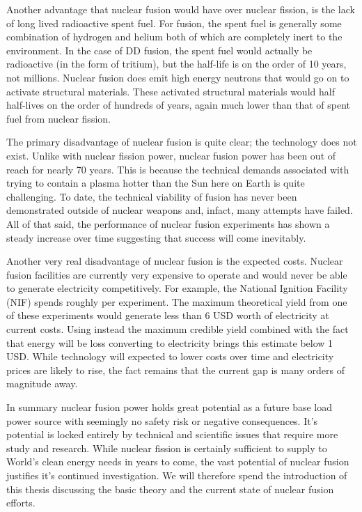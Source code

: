 		Another advantage that nuclear fusion would have over nuclear fission, is the lack of long lived radioactive spent fuel. For fusion, the spent fuel is generally some combination of hydrogen and helium both of which are completely inert to the environment. \cite{bibid} In the case of DD fusion, the spent fuel would actually be radioactive (in the form of tritium), but the half-life is on the order of 10 years, not millions. \cite{bibid} Nuclear fusion does emit high energy neutrons that would go on to activate structural materials. These activated structural materials would half half-lives on the order of hundreds of years, again much lower than that of spent fuel from nuclear fission. \cite{bibid}
		
		The primary disadvantage of nuclear fusion is quite clear; the technology does not exist. Unlike with nuclear fission power, nuclear fusion power has been out of reach for nearly 70 years. \cite{bibid} This is because the technical demands associated with trying to contain a plasma hotter than the Sun here on Earth is quite challenging. To date, the technical viability of fusion has never been demonstrated outside of nuclear weapons and, infact, many attempts have failed. \cite{bibid} All of that said, the performance of nuclear fusion experiments has shown a steady increase over time suggesting that success will come inevitably. \cite{bibid}
		
		Another very real disadvantage of nuclear fusion is the expected costs. Nuclear fusion facilities are currently very expensive to operate and would never be able to generate electricity competitively. \cite{bibid} For example, the National Ignition Facility (NIF) spends roughly  per experiment. \cite{bibid} The maximum theoretical yield from one of these experiments would generate less than 6 USD worth of electricity at current costs. \cite{bibid} Using instead the maximum credible yield combined with the fact that energy will be loss converting to electricity brings this estimate below 1 USD. \cite{bibid} While technology will expected to lower costs over time and electricity prices are likely to rise, the fact remains that the current gap is many orders of magnitude away.
		
		In summary nuclear fusion power holds great potential as a future base load power source with seemingly no safety risk or negative consequences. It's potential is locked entirely by technical and scientific issues that require more study and research. While nuclear fission is certainly sufficient to supply to World's clean energy needs in years to come, the vast potential of nuclear fusion justifies it's continued investigation. We will therefore spend the introduction of this thesis discussing the basic theory and the current state of nuclear fusion efforts. 
	
	
	
	
	
	
	
	
	
	\cite{Z_Ref}
	
	\begin{singlespace}
	    
		
	\end{singlespace}
	
	
	
	
	
